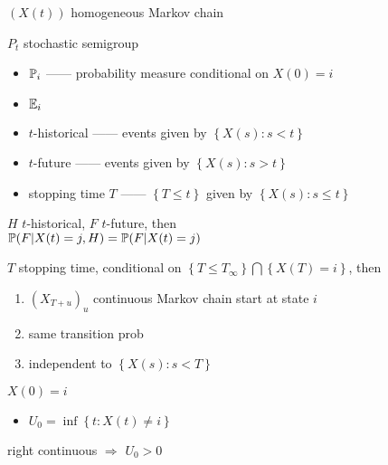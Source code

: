 \begin{setting}
    $(X(t))$ homogeneous Markov chain
\end{setting}

\begin{thm}
    $P_t$ stochastic semigroup
\end{thm}

\begin{itemize}
    \item $\mathbb{P}_i$ ------ probability measure conditional on $X(0) = i$
    \item $\mathbb{E}_i$
    \item $t$-historical ------ events given by $\left\{ X(s) : s < t \right\}$
    \item $t$-future ------ events given by $\left\{ X(s) : s > t \right\}$
    \item stopping time $T$ ------ $\left\{ T \leq t \right\}$ given by $\left\{ X(s) : s \leq t \right\}$
\end{itemize}

\begin{thm}
    $H$ $t$-historical, $F$ $t$-future, then \\$\mathbb{P}(F|X(t) = j, H) = \mathbb{P}(F | X(t) = j)$
\end{thm}

\begin{thm}
    $T$ stopping time, conditional on $\left\{ T \leq T_\infty \right\} \bigcap \left\{ X(T) = i \right\}$, then
    \begin{enumerate}
        \item $(X_{T + u})_u$ continuous Markov chain start at state $i$
        \item same transition prob
        \item independent to $\left\{ X(s) : s < T \right\}$
    \end{enumerate}
\end{thm}

\begin{setting}
    $X(0) = i$
\end{setting}

\begin{itemize}
    \item $U_0 = \inf \left\{ t : X(t) \neq i \right\}$
\end{itemize}

\begin{fact}
    right continuous $\Rightarrow$ $U_0 > 0$
\end{fact}

